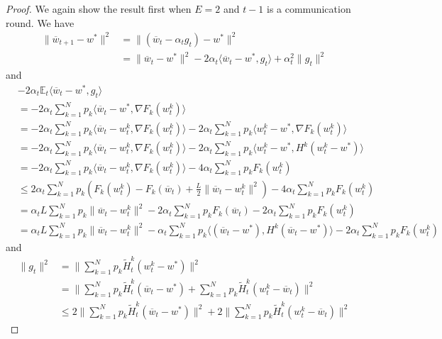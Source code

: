 \begin{proof}
	We again show the result first when $E=2$ and $t-1$ is a communication
	round. We have 
	\begin{align*}
	\|\overline{w}_{t+1}-w^{\ast}\|^{2} & =\|(\overline{w}_{t}-\alpha_{t}g_{t})-w^{\ast}\|^{2}\\
	& =\|\overline{w}_{t}-w^{\ast}\|^{2}-2\alpha_{t}\langle\overline{w}_{t}-w^{\ast},g_{t}\rangle+\alpha_{t}^{2}\|g_{t}\|^{2}
	\end{align*}
	and 
	\begin{align*}
	& -2\alpha_{t}\mathbb{E}_{t}\langle\overline{w}_{t}-w^{\ast},g_{t}\rangle\\
	& =-2\alpha_{t}\sum_{k=1}^{N}p_{k}\langle\overline{w}_{t}-w^{\ast},\nabla F_{k}(w_{t}^{k})\rangle\\
	& =-2\alpha_{t}\sum_{k=1}^{N}p_{k}\langle\overline{w}_{t}-w_{t}^{k},\nabla F_{k}(w_{t}^{k})\rangle-2\alpha_{t}\sum_{k=1}^{N}p_{k}\langle w_{t}^{k}-w^{\ast},\nabla F_{k}(w_{t}^{k})\rangle\\
	& =-2\alpha_{t}\sum_{k=1}^{N}p_{k}\langle\overline{w}_{t}-w_{t}^{k},\nabla F_{k}(w_{t}^{k})\rangle-2\alpha_{t}\sum_{k=1}^{N}p_{k}\langle w_{t}^{k}-w^{\ast},H^{k}(w_{t}^{k}-w^{\ast})\rangle\\
	& =-2\alpha_{t}\sum_{k=1}^{N}p_{k}\langle\overline{w}_{t}-w_{t}^{k},\nabla F_{k}(w_{t}^{k})\rangle-4\alpha_{t}\sum_{k=1}^{N}p_{k}F_{k}(w_{t}^{k})\\
	& \leq2\alpha_{t}\sum_{k=1}^{N}p_{k}(F_{k}(w_{t}^{k})-F_{k}(\overline{w}_{t})+\frac{L}{2}\|\overline{w}_{t}-w_{t}^{k}\|^{2})-4\alpha_{t}\sum_{k=1}^{N}p_{k}F_{k}(w_{t}^{k})\\
	& =\alpha_{t}L\sum_{k=1}^{N}p_{k}\|\overline{w}_{t}-w_{t}^{k}\|^{2}-2\alpha_{t}\sum_{k=1}^{N}p_{k}F_{k}(\overline{w}_{t})-2\alpha_{t}\sum_{k=1}^{N}p_{k}F_{k}(w_{t}^{k})\\
	& =\alpha_{t}L\sum_{k=1}^{N}p_{k}\|\overline{w}_{t}-w_{t}^{k}\|^{2}-\alpha_{t}\sum_{k=1}^{N}p_{k}\langle(\overline{w}_{t}-w^{\ast}),H^{k}(\overline{w}_{t}-w^{\ast})\rangle-2\alpha_{t}\sum_{k=1}^{N}p_{k}F_{k}(w_{t}^{k})
	\end{align*}
	and 
	\begin{align*}
	\|g_{t}\|^{2} & =\|\sum_{k=1}^{N}p_{k}\tilde{H}_{t}^{k}(w_{t}^{k}-w^{\ast})\|^{2}\\
	& =\|\sum_{k=1}^{N}p_{k}\tilde{H}_{t}^{k}(\overline{w}_{t}-w^{\ast})+\sum_{k=1}^{N}p_{k}\tilde{H}_{t}^{k}(w_{t}^{k}-\overline{w}_{t})\|^{2}\\
	& \leq2\|\sum_{k=1}^{N}p_{k}\tilde{H}_{t}^{k}(\overline{w}_{t}-w^{\ast})\|^{2}+2\|\sum_{k=1}^{N}p_{k}\tilde{H}_{t}^{k}(w_{t}^{k}-\overline{w}_{t})\|^{2}

\end{align*}
\end{proof}
